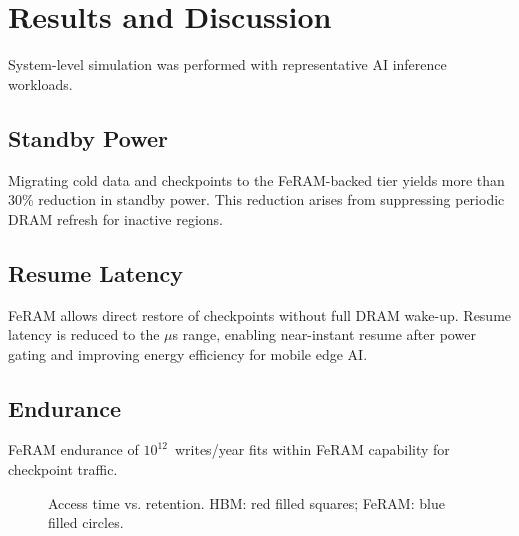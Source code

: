 \section{Results and Discussion}
System-level simulation was performed with representative AI inference workloads.

\subsection{Standby Power}
Migrating cold data and checkpoints to the FeRAM-backed tier yields more than 30\% reduction in standby power.
This reduction arises from suppressing periodic DRAM refresh for inactive regions.

\subsection{Resume Latency}
FeRAM allows direct restore of checkpoints without full DRAM wake-up.
Resume latency is reduced to the $\mu$s range, enabling near-instant resume after power gating and improving energy efficiency for mobile edge AI.

\subsection{Endurance}
FeRAM endurance of $10^{12}$~writes/year fits within FeRAM capability for checkpoint traffic.

\begin{figure}[!t]
\centering
{}
\caption{Access time vs. retention. HBM: red filled squares; FeRAM: blue filled circles.}
\label{fig:access_vs_retention}
\end{figure}
